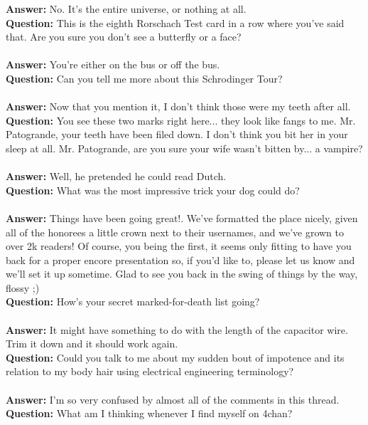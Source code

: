 \documentclass[a4paper]{article}
\begin{document}
\textbf{Answer:} No. It's the entire universe, or nothing at all. \\
\textbf{Question:} This is the eighth Rorschach Test card in a row where you've said that. Are you sure you don't see a butterfly or a face? \\ \\
\textbf{Answer:} You're either on the bus or off the bus. \\
\textbf{Question:} Can you tell me more about this Schrodinger Tour? \\ \\
\textbf{Answer:} Now that you mention it, I don't think those were my teeth after all. \\
\textbf{Question:} You see these two marks right here... they look like fangs to me. Mr. Patogrande, your teeth have been filed down. I don't think you bit her in your sleep at all. Mr. Patogrande, are you sure your wife wasn't bitten by... a vampire? \\ \\
\textbf{Answer:} Well, he pretended he could read Dutch. \\
\textbf{Question:} What was the most impressive trick your dog could do? \\ \\
\textbf{Answer:} Things have been going great!. We've formatted the place nicely, given all of the honorees a little crown next to their usernames, and we've grown to over 2k readers! Of course, you being the first, it seems only fitting to have you back for a proper encore presentation so, if you'd like to, please let us know and we'll set it up sometime. Glad to see you back in the swing of things by the way, flossy ;) \\
\textbf{Question:} How's your secret marked-for-death list going? \\ \\
\textbf{Answer:} It might have something to do with the length of the capacitor wire. Trim it down and it should work again. \\
\textbf{Question:} Could you talk to me about my sudden bout of impotence and its relation to my body hair using electrical engineering terminology? \\ \\
\textbf{Answer:} I'm so very confused by almost all of the comments in this thread. \\
\textbf{Question:} What am I thinking whenever I find myself on 4chan? \\ \\
\end{document}
